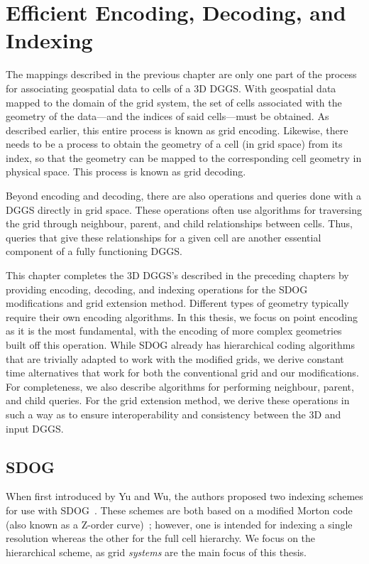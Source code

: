 \chapter{Efficient Encoding, Decoding, and Indexing} \label{chap:coding}
The mappings described in the previous chapter are only one part of the process for associating geospatial data to cells of a 3D DGGS.
With geospatial data mapped to the domain of the grid system, the set of cells associated with the geometry of the data---and the indices of said cells---must be obtained.
As described earlier, this entire process is known as grid encoding.
Likewise, there needs to be a process to obtain the geometry of a cell (in grid space) from its index, so that the geometry can be mapped to the corresponding cell geometry in physical space.
This process is known as grid decoding.


Beyond encoding and decoding, there are also operations and queries done with a DGGS directly in grid space.
These operations often use algorithms for traversing the grid through neighbour, parent, and child relationships between cells.
Thus, queries that give these relationships for a given cell are another essential component of a fully functioning DGGS.


This chapter completes the 3D DGGS's described in the preceding chapters by providing encoding, decoding, and indexing operations for the SDOG modifications and grid extension method.
Different types of geometry typically require their own encoding algorithms.
In this thesis, we focus on point encoding as it is the most fundamental, with the encoding of more complex geometries built off this operation.
While SDOG already has hierarchical coding algorithms~\cite{yu2009sdog, yu2009coding} that are trivially adapted to work with the modified grids, we derive constant time alternatives that work for both the conventional grid and our modifications.
For completeness, we also describe algorithms for performing neighbour, parent, and child queries.
For the grid extension method, we derive these operations in such a way as to ensure interoperability and consistency between the 3D and input DGGS.


\section{SDOG}
When first introduced by Yu and Wu, the authors proposed two indexing schemes for use with SDOG~\cite{yu2009coding}.
These schemes are both based on a modified Morton code (also known as a Z-order curve)~\cite{morton1966computer}; however, one is intended for indexing a single resolution whereas the other for the full cell hierarchy.
We focus on the hierarchical scheme, as grid \textit{systems} are the main focus of this thesis.


